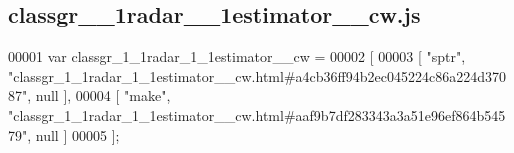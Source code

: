 \subsection{classgr\+\_\+\_\+1radar\+\_\+\_\+1estimator\+\_\+\+\_\+cw.\+js}
\label{classgr__1__1radar__1__1estimator____cw_8js_source}

\begin{DoxyCode}
00001 var classgr_1_1radar_1_1estimator__cw =
00002 [
00003     [ \textcolor{stringliteral}{"sptr"}, \textcolor{stringliteral}{"classgr\_1\_1radar\_1\_1estimator\_\_cw.html#a4cb36ff94b2ec045224c86a224d37087"}, null ],
00004     [ \textcolor{stringliteral}{"make"}, \textcolor{stringliteral}{"classgr\_1\_1radar\_1\_1estimator\_\_cw.html#aaf9b7df283343a3a51e96ef864b54579"}, null ]
00005 ];
\end{DoxyCode}
